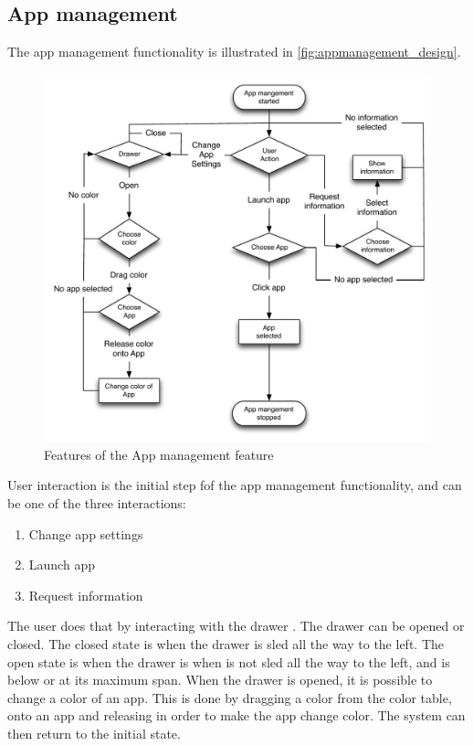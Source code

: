 \subsection{App management}
\label{design:app_manangement}
The app management functionality is illustrated in \autoref{fig:appmanagement_design}. 
\begin{figure}[h]
	\centering
	\includegraphics[width=1\textwidth]{gfx/appmanagement.pdf}
	\caption{Features of the App management feature}
	\label{fig:appmanagement_design}
\end{figure}
User interaction is the initial step fof the app management functionality, and can be one of the three interactions:

\begin{enumerate}
	\item Change app settings
	\item Launch app
	\item Request information
\end{enumerate}

The user does that by interacting with the drawer .
The drawer can be opened or closed.
The closed state is when the drawer is sled all the way to the left.
The open state is when the drawer is when is not sled all the way to the left, and is below or at its maximum span.
When the drawer is opened, it is possible to change a color of an app.
This is done by dragging a color from the color table, onto an app and releasing in order to make the app change color.
The system can then return to the initial state.

